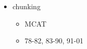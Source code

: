 \documentclass[12pt]{article}
\begin{document}
%
%
%
%
%



{\color{red}
\begin{itemize}
\item chunking
	\begin{itemize}
	\item MCAT
	\item 78-82, 83-90, 91-01
	\end{itemize}
\end{itemize}
}
\end{document}
